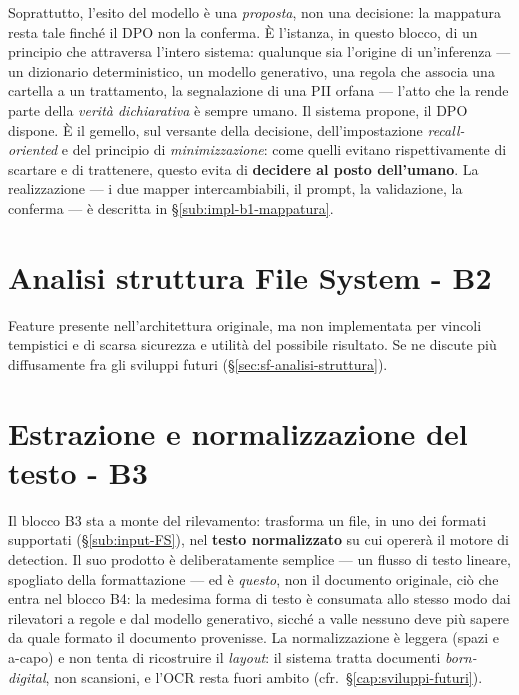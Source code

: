 Soprattutto, l'esito del modello è una \emph{proposta}, non una decisione: la mappatura resta tale finché il DPO non la conferma. È l'istanza, in questo blocco, di un principio che attraversa l'intero sistema: qualunque sia l'origine di un'inferenza --- un dizionario deterministico, un modello generativo, una regola che associa una cartella a un trattamento, la segnalazione di una PII orfana --- l'atto che la rende parte della \emph{verità dichiarativa} è sempre umano. Il sistema propone, il DPO dispone. È il gemello, sul versante della decisione, dell'impostazione \emph{recall-oriented} e del principio di \emph{minimizzazione}: come quelli evitano rispettivamente di scartare e di trattenere, questo evita di \textbf{decidere al posto dell'umano}. La realizzazione --- i due mapper intercambiabili, il prompt, la validazione, la conferma --- è descritta in §\ref{sub:impl-b1-mappatura}.

\section{Analisi struttura File System - B2}
\label{sec:b2-analisi-struttura}
Feature presente nell'architettura originale, ma non implementata per vincoli tempistici e di scarsa sicurezza e utilità del possibile risultato. Se ne discute più diffusamente fra gli sviluppi futuri (§\ref{sec:sf-analisi-struttura}).

\section{Estrazione e normalizzazione del testo - B3}
\label{sec:b3-estrazione-testo}

Il blocco B3 sta a monte del rilevamento: trasforma un file, in uno dei formati supportati (§\ref{sub:input-FS}), nel \textbf{testo normalizzato} su cui opererà il motore di detection. Il suo prodotto è deliberatamente semplice --- un flusso di testo lineare, spogliato della formattazione --- ed è \emph{questo}, non il documento originale, ciò che entra nel blocco B4: la medesima forma di testo è consumata allo stesso modo dai rilevatori a regole e dal modello generativo, sicché a valle nessuno deve più sapere da quale formato il documento provenisse. La normalizzazione è leggera (spazi e a-capo) e non tenta di ricostruire il \emph{layout}: il sistema tratta documenti \emph{born-digital}, non scansioni, e l'OCR resta fuori ambito (cfr.~§\ref{cap:sviluppi-futuri}).

